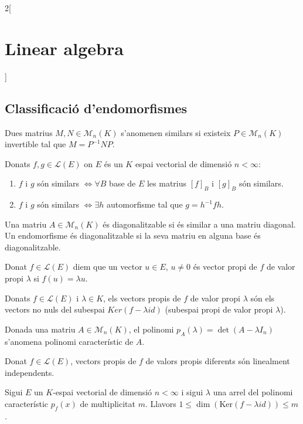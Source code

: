 \documentclass[../../../main.tex]{subfiles}
\begin{document}
\begin{multicols}{2}[\section{Linear algebra}]
\subsection{Classificació d'endomorfismes}
\begin{definition}
Dues matrius $M,N\in\mathcal{M}_n(K)$ s'anomenen similars si existeix $P\in\mathcal{M}_n(K)$ invertible tal que $M=P^{-1}NP$.
\end{definition}
\begin{prop}
Donats $f,g\in\mathcal{L}(E)$ on $E$ és un $K$ espai vectorial de dimensió $n<\infty$:
\begin{enumerate}
    \item $f$ i $g$ són similars $\iff\forall B$ base de $E$ les matrius $[f]_B$ i $[g]_B$ són similars.
    \item $f$ i $g$ són similars $\iff\exists h$ automorfisme tal que $g=h^{-1}fh$.
\end{enumerate}
\end{prop}
\begin{definition}
Una matriu $A\in\mathcal{M}_n(K)$ és diagonalitzable si és similar a una matriu diagonal. Un endomorfisme és diagonalitzable si la seva matriu en alguna base és diagonalitzable.
\end{definition}
\begin{definition}
Donat $f\in\mathcal{L}(E)$ diem que un vector $u\in E$, $u\ne 0$ és vector propi de $f$ de valor propi $\lambda$ si $f(u)=\lambda u$.
\end{definition}
\begin{lemma}
Donats $f\in\mathcal{L}(E)$ i $\lambda\in K$, els vectors propis de $f$ de valor propi $\lambda$ són els vectors no nuls del subespai $Ker(f-\lambda id)$ (subespai propi de valor propi $\lambda$).
\end{lemma}
\begin{definition}
Donada una matriu $A\in\mathcal{M}_n(K)$, el polinomi $p_A(\lambda)=\det(A-\lambda I_n)$ s'anomena polinomi característic de $A$.
\end{definition}
\begin{prop}
Donat $f\in\mathcal{L}(E)$, vectors propis de $f$ de valors propis diferents són linealment independents.
\end{prop}
\begin{prop}
Sigui $E$ un $K$-espai vectorial de dimensió $n<\infty$ i sigui $\lambda$ una arrel del polinomi característic $p_f(x)$ de multiplicitat $m$. Llavors $1\leq \dim(\text{Ker}(f-\lambda id))\leq m$.
\end{prop}

\end{multicols}
\end{document}

